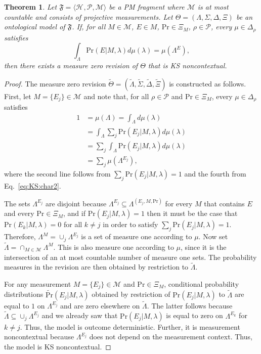 \documentclass[DIV=calc,paper=a4,fontsize=11pt,twocolumn]{scrartcl} %
\theoremstyle{definition}
\theoremstyle{plain}
\newtheorem{theorem}[definition]{Theorem}
\newcommand{\Hilb}[1][]{\ensuremath{\mathcal{H}_{#1}}}
\begin{document}
\begin{theorem}
\label{prop:KS:conv}
Let $\mathfrak{F} = \langle \Hilb, \mathcal{P}, \mathcal{M} \rangle$
be a PM fragment where $\mathcal{M}$ is at most countable and
consists of projective measurements.  Let $\Theta = (\Lambda,
\Sigma, \Delta, \Xi)$ be an ontological model of $\mathfrak{F}$.
If, for all $M \in \mathcal{M}$, $E \in M$, $\mathrm{Pr} \in \Xi_M$,
$\rho \in \mathcal{P}$, every $\mu \in \Delta_{\rho}$ satisfies
\begin{equation}
\label{eq:KS:char2}
\int_{\Lambda} \mathrm{Pr}(E|M,\lambda) d\mu(\lambda) =
\mu(\Lambda^E),
\end{equation}
then there exists a measure zero revision of $\Theta$ that is KS
noncontextual.
\end{theorem}
\begin{proof}
The measure zero revision $\tilde{\Theta} = (\tilde{\Lambda},
\tilde{\Sigma}, \tilde{\Delta}, \tilde{\Xi})$ is constructed as
follows.  First, let $M = \{E_j\} \in \mathcal{M}$ and note that,
for all $\rho \in \mathcal{P}$ and $\text{Pr} \in \Xi_M$, every $\mu
\in \Delta_{\rho}$ satisfies
\begin{align}
1 & = \mu(\Lambda) = \int_{\Lambda} d \mu(\lambda) \\
& = \int_{\Lambda} \sum_j \text{Pr}(E_j|M,\lambda)
d \mu(\lambda) \\
& = \sum_j \int_{\Lambda} \text{Pr}(E_j|M,\lambda) d \mu(\lambda) \\
& = \sum_j \mu(\Lambda^{E_j}),
\end{align}
where the second line follows from $\sum_j \text{Pr}(E_j|M,\lambda)
= 1$ and the fourth from Eq.~\eqref{eq:KS:char2}.

The sets $\Lambda^{E_j}$ are disjoint because $\Lambda^{E_j}
\subseteq \Lambda^{(E_j,M,\text{Pr})}$ for every $M$ that contains
$E$ and every $\text{Pr} \in \Xi_M$, and if
$\text{Pr}(E_j|M,\lambda) = 1$ then it must be the case that
$\text{Pr}(E_k|M,\lambda) = 0$ for all $k \neq j$ in order to
satisfy $\sum_j \text{Pr}(E_j|M,\lambda) = 1$.  Therefore,
$\Lambda^M = \cup_j \Lambda^{E_j}$ is a set of measure one according
to $\mu$.  Now set $\tilde{\Lambda} = \cap_{M \in \mathcal{M}}
\Lambda^M$.  This is also measure one according to $\mu$, since it
is the intersection of an at most countable number of measure one
sets.  The probability measures in the revision are then obtained by
restriction to $\tilde{\Lambda}$.

For any measurement $M = \{E_j\} \in \mathcal{M}$ and $\text{Pr} \in
\Xi_M$, conditional probability distributions
$\tilde{\text{Pr}}(E_j|M,\lambda)$ obtained by restriction of
$\text{Pr}(E_j|M,\lambda)$ to $\tilde{\Lambda}$ are equal to $1$ on
$\Lambda^{E_j}$ and are zero elsewhere on $\tilde{\Lambda}$.  The
latter follows because $\tilde{\Lambda} \subseteq \cup_j
\Lambda^{E_j}$ and we already saw that $\text{Pr}(E_j|M,\lambda)$ is
equal to zero on $\Lambda^{E_k}$ for $k \neq j$.  Thus, the model is
outcome deterministic.  Further, it is measurement noncontextual
because $\Lambda^{E_j}$ does not depend on the measurement context.
Thus, the model is KS noncontextual.
\end{proof}
\end{document}
